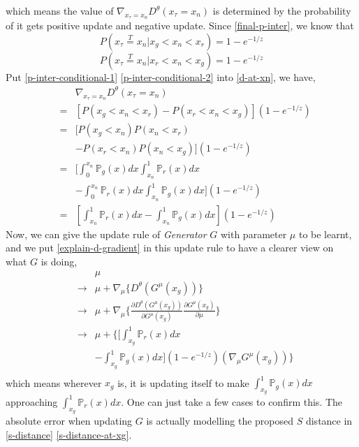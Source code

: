 \documentclass[letterpaper]{article} %
\begin{document}
which means the value of $\nabla_{x_{\tau}=x_n} D^{\theta}(x_{\tau}=x_n)$ is determined by the probability of it gets positive update and negative update.
Since \eqref{final-p-inter}, we know that
\begin{equation}\label{p-inter-conditional-1}
  P(x_\tau\overset{T}{=}x_n|x_g<x_n<x_r)=1 - e^{-1/z}
\end{equation}
\begin{equation}\label{p-inter-conditional-2}
  P(x_\tau\overset{T}{=}x_n|x_r<x_n<x_g)=1 - e^{-1/z}
\end{equation}
Put \eqref{p-inter-conditional-1} \eqref{p-inter-conditional-2} into \eqref{d-at-xn}, we have,
\begin{eqnarray}\label{explain-d-gradient}
    && \nabla_{x_{\tau}=x_n} D^{\theta}(x_{\tau}=x_n) \nonumber\\
    &=& [P(x_g<x_n<x_r) - P(x_r<x_n<x_g)](1 - e^{-1/z}) \nonumber\\
    &=& [P(x_g<x_n)P(x_n<x_r) \nonumber\\
    && - P(x_r<x_n)P(x_n<x_g)](1 - e^{-1/z}) \nonumber\\
    &=& [\int_{0}^{x_n}\mathbb{P}_g(x)dx \int_{x_n}^{1}\mathbb{P}_r(x)dx \nonumber\\
    && - \int_{0}^{x_n}\mathbb{P}_r(x)dx \int_{x_n}^{1}\mathbb{P}_g(x)dx](1 - e^{-1/z}) \nonumber\\
    &=& [\int_{x_n}^{1}\mathbb{P}_r(x)dx-\int_{x_n}^{1}\mathbb{P}_g(x)dx](1 - e^{-1/z})
\end{eqnarray}
Now, we can give the update rule of \textit{Generator} $G$ with parameter $\mu$ to be learnt, and we put \eqref{explain-d-gradient} in this update rule to have a clearer view on what $G$ is doing,
\begin{eqnarray}\label{g-loss}
  && \mu \nonumber\\
  & \longrightarrow & \mu + \nabla_{\mu} \{ D^{\theta}(G^{\mu}(x_g)) \} \nonumber\\
  & \longrightarrow & \mu + \nabla_{\mu} \{ \frac{\partial D^{\theta}(G^{\mu}(x_g))}{\partial G^{\mu}(x_g)} \frac{\partial G^{\mu}(x_g)}{\partial \mu} \} \nonumber\\
  & \longrightarrow & \mu + \{[\int_{x_g}^{1}\mathbb{P}_r(x)dx\nonumber\\
  && -\int_{x_g}^{1}\mathbb{P}_g(x)dx](1 - e^{-1/z})(\nabla_{\mu}G^{\mu}(x_g)) \} \nonumber\\
\end{eqnarray}
which means wherever $x_g$ is, it is updating itself to make $\int_{x_g}^{1}\mathbb{P}_g(x)dx$ approaching $\int_{x_g}^{1}\mathbb{P}_r(x)dx$.
One can just take a few cases to confirm this.
The absolute error when updating $G$ is actually modelling the proposed $S$ distance in \eqref{s-distance} \eqref{s-distance-at-xg}.
\end{document}
